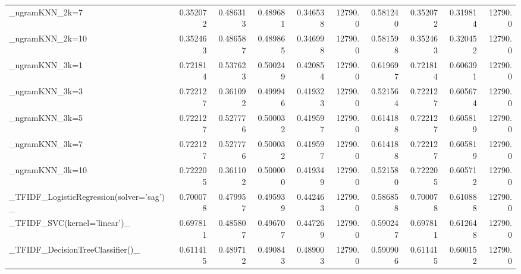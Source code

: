 \begin{tabular}{lrrrrrrrrr}
\_ngramKNN\_2k=7                                     &  0.352072 &         0.486313 &      0.489681 &        0.346538 &        12790.0 &            0.581240 &         0.352072 &           0.319814 &           12790.0 \\
\_ngramKNN\_2k=10                                    &  0.352463 &         0.486587 &      0.489865 &        0.346998 &        12790.0 &            0.581598 &         0.352463 &           0.320452 &           12790.0 \\
\_ngramKNN\_3k=1                                     &  0.721814 &         0.537623 &      0.500249 &        0.420854 &        12790.0 &            0.619697 &         0.721814 &           0.606391 &           12790.0 \\
\_ngramKNN\_3k=3                                     &  0.722127 &         0.361092 &      0.499946 &        0.419323 &        12790.0 &            0.521564 &         0.722127 &           0.605674 &           12790.0 \\
\_ngramKNN\_3k=5                                     &  0.722127 &         0.527776 &      0.500032 &        0.419597 &        12790.0 &            0.614188 &         0.722127 &           0.605819 &           12790.0 \\
\_ngramKNN\_3k=7                                     &  0.722127 &         0.527776 &      0.500032 &        0.419597 &        12790.0 &            0.614188 &         0.722127 &           0.605819 &           12790.0 \\
\_ngramKNN\_3k=10                                    &  0.722205 &         0.361102 &      0.500000 &        0.419349 &        12790.0 &            0.521580 &         0.722205 &           0.605712 &           12790.0 \\
\_TFIDF\_LogisticRegression(solver='sag')\_           &  0.700078 &         0.479957 &      0.495939 &        0.442463 &        12790.0 &            0.586858 &         0.700078 &           0.610888 &           12790.0 \\
\_TFIDF\_SVC(kernel='linear')\_                       &  0.697811 &         0.485807 &      0.496707 &        0.447269 &        12790.0 &            0.590247 &         0.697811 &           0.612648 &           12790.0 \\
\_TFIDF\_DecisionTreeClassifier()\_                   &  0.611415 &         0.489712 &      0.490843 &        0.489003 &        12790.0 &            0.590906 &         0.611415 &           0.600152 &           12790.0 \\

\end{tabular}
